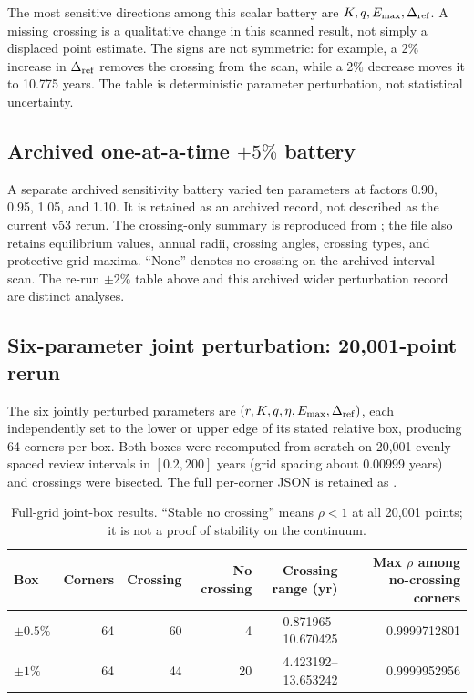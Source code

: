 The most sensitive directions among this scalar battery are \(K,q,E_{\max},\Delta_{\rm ref}\). A missing crossing is a qualitative change in this scanned result, not simply a displaced point estimate. The signs are not symmetric: for example, a 2\% increase in \(\Delta_{\rm ref}\) removes the crossing from the scan, while a 2\% decrease moves it to 10.775 years. The table is deterministic parameter perturbation, not statistical uncertainty.

\subsection{Archived one-at-a-time \texorpdfstring{\(\pm5\%\)}{+/-5 percent} battery}

A separate archived sensitivity battery varied ten parameters at factors 0.90, 0.95, 1.05, and 1.10. It is retained as an archived record, not described as the current v53 rerun. The crossing-only summary is reproduced from ; the file also retains equilibrium values, annual radii, crossing angles, crossing types, and protective-grid maxima. ``None'' denotes no crossing on the archived interval scan. The re-run \(\pm2\%\) table above and this archived wider perturbation record are distinct analyses.



\subsection{Six-parameter joint perturbation: 20,001-point rerun}

The six jointly perturbed parameters are \((r,K,q,\eta,E_{\max},\Delta_{\rm ref})\), each independently set to the lower or upper edge of its stated relative box, producing 64 corners per box. Both boxes were recomputed from scratch on 20,001 evenly spaced review intervals in \([0.2,200]\) years (grid spacing about 0.00999 years) and crossings were bisected. The full per-corner JSON is retained as \texttt{}.

\begin{table}[htbp]
\centering\small
\caption{Full-grid joint-box results. ``Stable no crossing'' means \(\rho<1\) at all 20,001 points; it is not a proof of stability on the continuum.}
\label{tab:joint-box}
\begin{tabular}{@{}lrrrrr@{}}
\toprule Box & Corners & Crossing & No crossing & Crossing range (yr) & Max \(\rho\) among no-crossing corners \\
\midrule
\(\pm0.5\%\) & 64 & 60 & 4 & 0.871965--10.670425 & 0.9999712801 \\
\(\pm1\%\) & 64 & 44 & 20 & 4.423192--13.653242 & 0.9999952956 \\
\bottomrule
\end{tabular}
\end{table}

